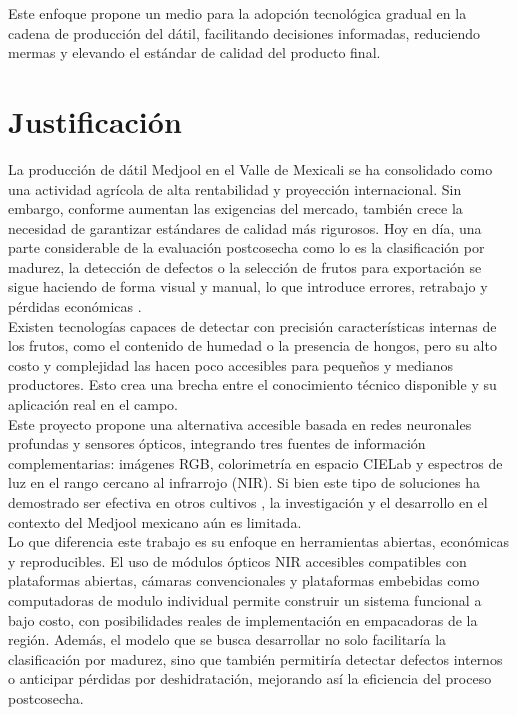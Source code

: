 Este enfoque propone un medio para la adopción tecnológica gradual en la cadena de producción del dátil, facilitando decisiones informadas, reduciendo mermas y elevando el estándar de calidad del producto final.


\section{Justificación}

La producción de dátil Medjool en el Valle de Mexicali se ha consolidado como una actividad agrícola de alta rentabilidad y proyección internacional. Sin embargo, conforme aumentan las exigencias del mercado, también crece la necesidad de garantizar estándares de calidad más rigurosos. Hoy en día, una parte considerable de la evaluación postcosecha como lo es la clasificación por madurez, la detección de defectos o la selección de frutos para exportación se sigue haciendo de forma visual y manual, lo que introduce errores, retrabajo y pérdidas económicas \parencite{perez-perez_evaluation_2021}.\\

Existen tecnologías capaces de detectar con precisión características internas de los frutos, como el contenido de humedad o la presencia de hongos, pero su alto costo y complejidad las hacen poco accesibles para pequeños y medianos productores. Esto crea una brecha entre el conocimiento técnico disponible y su aplicación real en el campo.\\

Este proyecto propone una alternativa accesible basada en redes neuronales profundas y sensores ópticos, integrando tres fuentes de información complementarias: imágenes RGB, colorimetría en espacio CIELab y espectros de luz en el rango cercano al infrarrojo (NIR). Si bien este tipo de soluciones ha demostrado ser efectiva en otros cultivos \parencite{chen_prediction_2024, wang_improving_2025}, la investigación y el desarrollo en el contexto del Medjool mexicano aún es limitada.\\

Lo que diferencia este trabajo es su enfoque en herramientas abiertas, económicas y reproducibles. El uso de módulos ópticos NIR accesibles compatibles con plataformas abiertas, cámaras convencionales y plataformas embebidas como computadoras de modulo individual permite construir un sistema funcional a bajo costo, con posibilidades reales de implementación en empacadoras de la región. Además, el modelo que se busca desarrollar no solo facilitaría la clasificación por madurez, sino que también permitiría detectar defectos internos o anticipar pérdidas por deshidratación, mejorando así la eficiencia del proceso postcosecha.
